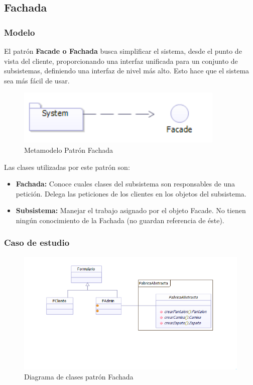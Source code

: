 \subsection{Fachada}
\subsubsection{Modelo}

El patrón \textbf{Facade o Fachada} busca simplificar el sistema, desde el punto de vista del cliente, proporcionando una interfaz unificada para un conjunto de subsistemas, definiendo una interfaz de nivel más alto. Esto hace que el sistema sea más fácil de usar.

\begin{figure}[th!]
	\centering
	\includegraphics[width=0.6\linewidth]{arquitectura/imagenes/modeloFachada}
	\caption{Metamodelo Patrón Fachada}
	\label{fig:metamodelo patron fachada}
\end{figure}


Las clases utilizadas por este patrón son:
\begin{itemize}
	\item \textbf{Fachada: }Conoce cuales clases del subsistema son responsables de una petición. Delega las peticiones de los clientes en los objetos del subsistema.
	\item \textbf{Subsistema: }Manejar el trabajo asignado por el objeto Facade. No tienen ningún conocimiento de la Fachada (no guardan referencia de éste).
\end{itemize}


\subsubsection{Caso de estudio}
\begin{figure}[h!]
	\centering
	\includegraphics[width=0.8\linewidth]{arquitectura/imagenes/DiagramaFachada}
	\caption{Diagrama de clases patrón Fachada}
\end{figure}

